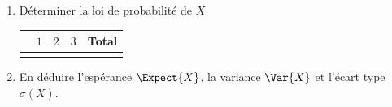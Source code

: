 \documentclass[main.tex]{subfiles}
\begin{document}
\begin{exercise}
\begin{enumerate}[leftmargin=*,label=\arabic*)]
\begin{tikzpicture}[xscale=1,yscale=1]
		\end{tikzpicture} 
		\hfill \null   
		\item Déterminer la loi de probabilité de $X$\\
		\renewcommand{\arraystretch}{1.1} 
		\null	\hfill \begin{tabularx}{0.7\linewidth}{|c|Y|Y|Y|c|}
			\hline
			 & $1$ & $2$ & $3$ & \textbf{Total}\\ \hline
			 &   &    &   & \\\hline
		\end{tabularx} 
		\hfill \null
		\item En déduire l'espérance  $\Expect{X}$, la variance $\Var{X}$ et l'écart type $\sigma(X)$.
	\end{enumerate} 
\end{exercise}
\end{document}
